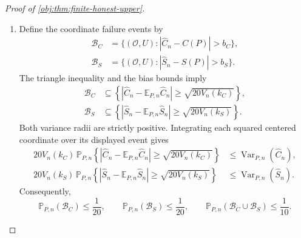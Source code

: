 \begin{proof}[Proof of \cref{obj:thm:finite-honest-upper}]
\begin{enumerate}
\item Define the coordinate failure events by
\[
\begin{aligned}
\mathcal B_C
&=\{(\mathcal O,U):|\widehat C_n-C(P)|>b_C\},\\
\mathcal B_S
&=\{(\mathcal O,U):|\widehat S_n-S(P)|>b_S\}.
\end{aligned}
\]
The triangle inequality and the bias bounds imply
\[
\begin{aligned}
\mathcal B_C
&\subseteq
\left\{
|\widehat C_n-\mathbb E_{P,n}\widehat C_n|
\ge\sqrt{20V_n(k_C)}
\right\},\\
\mathcal B_S
&\subseteq
\left\{
|\widehat S_n-\mathbb E_{P,n}\widehat S_n|
\ge\sqrt{20V_n(k_S)}
\right\}.
\end{aligned}
\]
Both variance radii are strictly positive. Integrating each squared centered coordinate over its displayed event gives
\[
\begin{aligned}
20V_n(k_C)\,
\mathbb P_{P,n}
\left\{
|\widehat C_n-\mathbb E_{P,n}\widehat C_n|
\ge\sqrt{20V_n(k_C)}
\right\}
&\le\operatorname{Var}_{P,n}(\widehat C_n),\\
20V_n(k_S)\,
\mathbb P_{P,n}
\left\{
|\widehat S_n-\mathbb E_{P,n}\widehat S_n|
\ge\sqrt{20V_n(k_S)}
\right\}
&\le\operatorname{Var}_{P,n}(\widehat S_n).
\end{aligned}
\]
Consequently,
\[
\mathbb P_{P,n}(\mathcal B_C)\le\frac1{20},
\qquad
\mathbb P_{P,n}(\mathcal B_S)\le\frac1{20},
\qquad
\mathbb P_{P,n}(\mathcal B_C\cup\mathcal B_S)\le\frac1{10}.
\]


\end{enumerate}
\end{proof}
